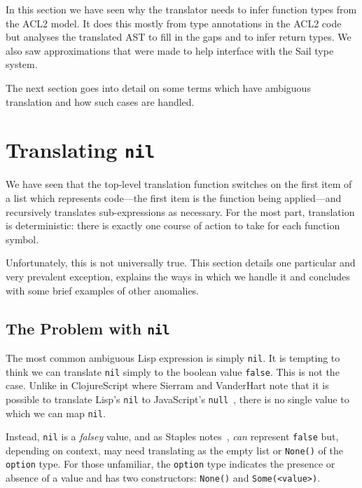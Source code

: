 \documentclass[a4paper,12pt,twoside,openright]{report}
\begin{document}
In this section we have seen why the translator needs to infer function types from the ACL2 model.  It does this mostly from type annotations in the ACL2 code but analyses the translated AST to fill in the gaps and to infer return types.  We also saw approximations that were made to help interface with the Sail type system.

The next section goes into detail on some terms which have ambiguous translation and how such cases are handled.

\hypertarget{nil}{
\section{Translating \texttt{nil}}\label{nil}}

We have seen that the top-level translation function switches on the first item of a list which represents code---the first item is the function being applied---and recursively translates sub-expressions as necessary.  For the most part, translation is deterministic: there is exactly one course of action to take for each function symbol.

Unfortunately, this is not universally true.  This section details one particular and very prevalent exception, explains the ways in which we handle it and concludes with some brief examples of other anomalies.


\subsection{The Problem with \texttt{nil}}
The most common ambiguous Lisp expression is simply \texttt{nil}.  It is tempting to think we can translate \texttt{nil} simply to the boolean value \texttt{false}.  This is not the case.  Unlike in ClojureScript where Sierram and VanderHart note that it is possible to translate Lisp's \texttt{nil} to JavaScript's \texttt{null}~\cite[ch.~5, p.~42]{clojure-script-nil}, there is no single value to which we can map \texttt{nil}.

Instead, \texttt{nil} is a \emph{falsey} value, and as Staples notes~\cite{staples}, \emph{can} represent \texttt{false} but, depending on context, may need translating as the empty list or \texttt{None()} of the \texttt{option} type.  For those unfamiliar, the \texttt{option} type indicates the presence or absence of a value and has two constructors: \texttt{None()} and \texttt{Some(<value>)}.
\end{document}
